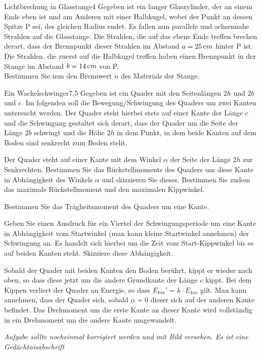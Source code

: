 \begin{problem}{Lichtbrechung in Glasstange}{4}
Gegeben ist ein langer Glaszylinder, der an einem Ende eben ist und am Anderen mit einer Halbkugel, wobei der Punkt an dessen Spitze P sei, des gleichen Radius endet. Es fallen nun parallele und achsennahe Strahlen auf die Glasstange. Die Strahlen, die auf das ebene Ende treffen brechen derart, dass der Brennpunkt dieser Strahlen im Abstand $a=25\,\mathrm{c}m$ hinter P ist. Die Strahlen, die zuerst auf die Halbkugel treffen haben einen Brennpunkt in der Stange im Abstand $b=14\,\mathrm{c}m$ von P.\\
Bestimmen Sie nun den Brennwert $n$ des Materials der Stange.
\end{problem}

\begin{problem}{Ein Wackelschwinger}{7,5}
Gegeben ist ein Quader mit den Seitenlängen $2h$ und $2b$ und $c$. Im folgenden soll die Bewegung/Schwingung des Quaders um zwei Kanten untersucht werden. Der Quader steht hierbei stets auf einer Kante der Länge $c$ und die Schwingung gestaltet sich derart, dass der Quader um die Seite der Länge $2b$ schwingt und die Höhe $2h$ in dem Punkt, in dem beide Kanten auf dem Boden sind senkrecht zum Boden steht.
\begin{abcenum}
  \item Der Quader steht auf einer Kante mit dem Winkel $\alpha$ der Seite der Länge $2h$ zur Senkrechten. Bestimmen Sie das Rückstellmoments des Quaders um diese Kante in Abhängigkeit des Winkels $\alpha$ und skizzieren Sie dieses. Bestimmen Sie zudem das maximale Rückstellmoment und den maximalen Kippwinkel.
  \item Bestimmen Sie das Trägheitsmoment des Quaders um eine Kante.
  \item Geben Sie einen Ausdruck für ein Viertel der Schwingungsperiode um eine Kante in Abhängigkeit vom Startwinkel (man kann kleine Startwinkel annehmen) der Schwingung an. Es handelt sich hierbei um die Zeit vom Start-Kippwinkel bis es auf beiden Kanten steht. Skizziere diese Abhängigkeit.
  \item Sobald der Quader mit beiden Kanten den Boden berührt, kippt er wieder nach oben, so dass diese jetzt um die andere Grundkante der Länge $c$ kippt. Bei dem Kippen verliert der Quader an Energie, so dass $E_{kin}'=k\cdot E_{kin}$ gilt. Man kann annehmen, dass der Quader sich, sobald $\alpha=0$ dieser sich auf der anderen Kante befindet. Das Drehmoment um die erste Kante an dieser Kante wird vollständig in ein Drehmoment um die andere Kante umgewandelt.
\end{abcenum}
\textit{Aufgabe sollte nocheinmal korrigiert werden und mit Bild versehen. Es ist eine Gedächtnisabschrift}
\end{problem}


 